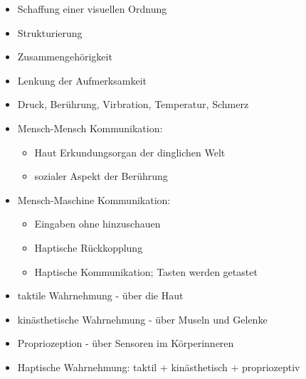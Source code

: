 \documentclass[12pt]{article}
\begin{document}
\begin{note}
    \begin{field}
        \begin{itemize}
            \item Schaffung einer visuellen Ordnung
            \item Strukturierung
            \item Zusammengehörigkeit
            \item Lenkung der Aufmerksamkeit
        \end{itemize}
    \end{field}
\end{note}

\begin{note}
    \begin{field}
        \begin{itemize}
            \item Druck, Berührung, Virbration, Temperatur, Schmerz
            \item Mensch-Mensch Kommunikation:
                \begin{itemize}
                    \item Haut Erkundungsorgan der dinglichen Welt
                    \item sozialer Aspekt der Berührung
                \end{itemize}
            \item Mensch-Maschine Kommunikation:
                \begin{itemize}
                    \item Eingaben ohne hinzuschauen
                    \item Haptische Rückkopplung
                    \item Haptische Kommunikation; Tasten werden getastet
                \end{itemize}
            \item taktile Wahrnehmung - über die Haut
            \item kinästhetische Wahrnehmung - über Museln und Gelenke
            \item Propriozeption - über Sensoren im Körperinneren
            \item Haptische Wahrnehmung: taktil + kinästhetisch + propriozeptiv
        \end{itemize}
    \end{field}
\end{note}
\end{document}
